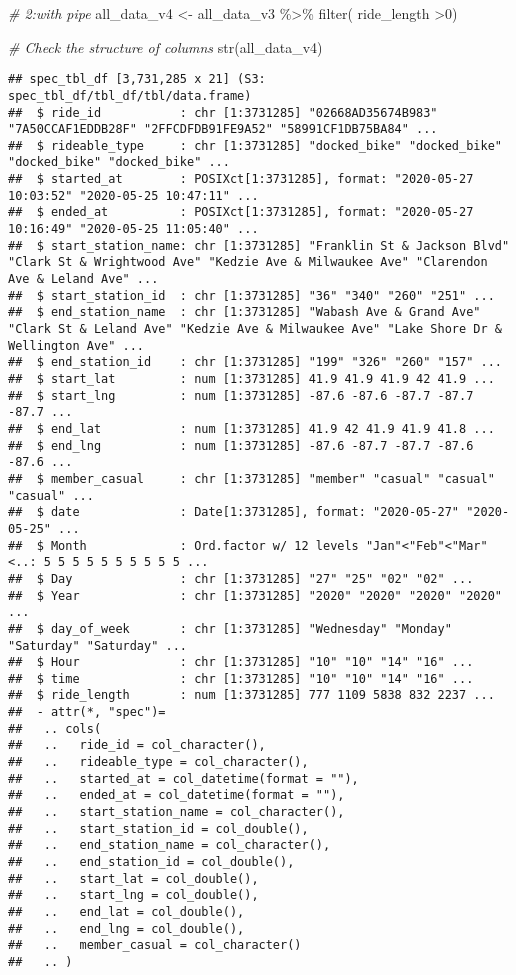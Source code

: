 \documentclass[
]{article}
\newenvironment{Shaded}{\begin{snugshade}}{\end{snugshade}}
\newcommand{\CommentTok}[1]{\textcolor[rgb]{0.56,0.35,0.01}{\textit{#1}}}
\newcommand{\DecValTok}[1]{\textcolor[rgb]{0.00,0.00,0.81}{#1}}
\newcommand{\FunctionTok}[1]{\textcolor[rgb]{0.00,0.00,0.00}{#1}}
\newcommand{\NormalTok}[1]{#1}
\newcommand{\OtherTok}[1]{\textcolor[rgb]{0.56,0.35,0.01}{#1}}
\newcommand{\SpecialCharTok}[1]{\textcolor[rgb]{0.00,0.00,0.00}{#1}}
\begin{document}
\begin{Shaded}
\begin{Highlighting}[]
\CommentTok{\# 2:with pipe}
\NormalTok{   all\_data\_v4 }\OtherTok{\textless{}{-}}\NormalTok{ all\_data\_v3 }\SpecialCharTok{\%\textgreater{}\%} 
     \FunctionTok{filter}\NormalTok{( ride\_length }\SpecialCharTok{\textgreater{}}\DecValTok{0}\NormalTok{)}
   
\CommentTok{\# Check the structure of columns}
   \FunctionTok{str}\NormalTok{(all\_data\_v4)}
\end{Highlighting}
\end{Shaded}

\begin{verbatim}
## spec_tbl_df [3,731,285 x 21] (S3: spec_tbl_df/tbl_df/tbl/data.frame)
##  $ ride_id           : chr [1:3731285] "02668AD35674B983" "7A50CCAF1EDDB28F" "2FFCDFDB91FE9A52" "58991CF1DB75BA84" ...
##  $ rideable_type     : chr [1:3731285] "docked_bike" "docked_bike" "docked_bike" "docked_bike" ...
##  $ started_at        : POSIXct[1:3731285], format: "2020-05-27 10:03:52" "2020-05-25 10:47:11" ...
##  $ ended_at          : POSIXct[1:3731285], format: "2020-05-27 10:16:49" "2020-05-25 11:05:40" ...
##  $ start_station_name: chr [1:3731285] "Franklin St & Jackson Blvd" "Clark St & Wrightwood Ave" "Kedzie Ave & Milwaukee Ave" "Clarendon Ave & Leland Ave" ...
##  $ start_station_id  : chr [1:3731285] "36" "340" "260" "251" ...
##  $ end_station_name  : chr [1:3731285] "Wabash Ave & Grand Ave" "Clark St & Leland Ave" "Kedzie Ave & Milwaukee Ave" "Lake Shore Dr & Wellington Ave" ...
##  $ end_station_id    : chr [1:3731285] "199" "326" "260" "157" ...
##  $ start_lat         : num [1:3731285] 41.9 41.9 41.9 42 41.9 ...
##  $ start_lng         : num [1:3731285] -87.6 -87.6 -87.7 -87.7 -87.7 ...
##  $ end_lat           : num [1:3731285] 41.9 42 41.9 41.9 41.8 ...
##  $ end_lng           : num [1:3731285] -87.6 -87.7 -87.7 -87.6 -87.6 ...
##  $ member_casual     : chr [1:3731285] "member" "casual" "casual" "casual" ...
##  $ date              : Date[1:3731285], format: "2020-05-27" "2020-05-25" ...
##  $ Month             : Ord.factor w/ 12 levels "Jan"<"Feb"<"Mar"<..: 5 5 5 5 5 5 5 5 5 5 ...
##  $ Day               : chr [1:3731285] "27" "25" "02" "02" ...
##  $ Year              : chr [1:3731285] "2020" "2020" "2020" "2020" ...
##  $ day_of_week       : chr [1:3731285] "Wednesday" "Monday" "Saturday" "Saturday" ...
##  $ Hour              : chr [1:3731285] "10" "10" "14" "16" ...
##  $ time              : chr [1:3731285] "10" "10" "14" "16" ...
##  $ ride_length       : num [1:3731285] 777 1109 5838 832 2237 ...
##  - attr(*, "spec")=
##   .. cols(
##   ..   ride_id = col_character(),
##   ..   rideable_type = col_character(),
##   ..   started_at = col_datetime(format = ""),
##   ..   ended_at = col_datetime(format = ""),
##   ..   start_station_name = col_character(),
##   ..   start_station_id = col_double(),
##   ..   end_station_name = col_character(),
##   ..   end_station_id = col_double(),
##   ..   start_lat = col_double(),
##   ..   start_lng = col_double(),
##   ..   end_lat = col_double(),
##   ..   end_lng = col_double(),
##   ..   member_casual = col_character()
##   .. )
\end{verbatim}
\end{document}
